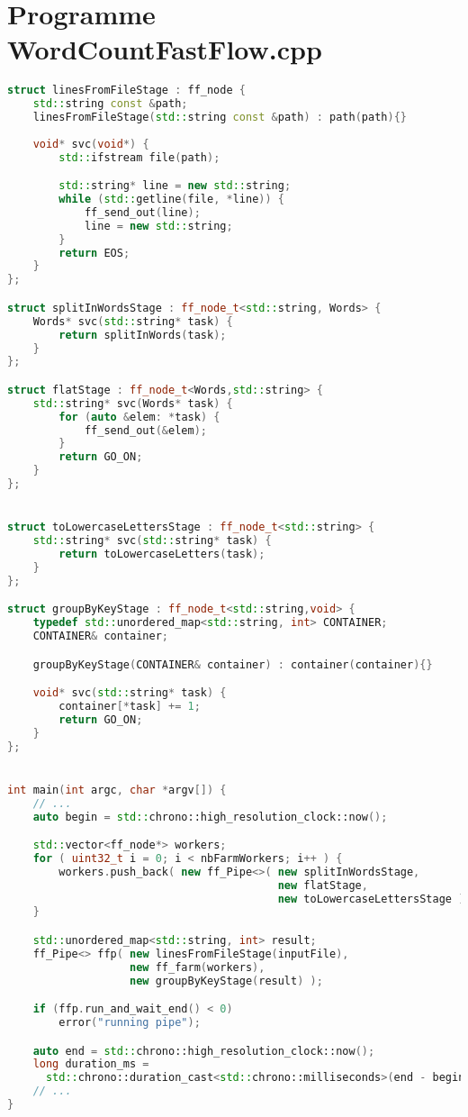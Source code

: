 \section{Programme {WordCountFastFlow.cpp}}
\begin{lstlisting}[basicstyle=\ttfamily\footnotesize,language=c++]
struct linesFromFileStage : ff_node {
    std::string const &path;
    linesFromFileStage(std::string const &path) : path(path){}
    
    void* svc(void*) {
        std::ifstream file(path);

        std::string* line = new std::string;
        while (std::getline(file, *line)) {
            ff_send_out(line);
            line = new std::string;
        }
        return EOS;
    }
};

struct splitInWordsStage : ff_node_t<std::string, Words> {
    Words* svc(std::string* task) {
        return splitInWords(task);
    }
};

struct flatStage : ff_node_t<Words,std::string> {
    std::string* svc(Words* task) {
        for (auto &elem: *task) {
            ff_send_out(&elem);
        }
        return GO_ON;
    }
};


struct toLowercaseLettersStage : ff_node_t<std::string> {
    std::string* svc(std::string* task) {
        return toLowercaseLetters(task);
    }
};

struct groupByKeyStage : ff_node_t<std::string,void> {
    typedef std::unordered_map<std::string, int> CONTAINER;
    CONTAINER& container;

    groupByKeyStage(CONTAINER& container) : container(container){}

    void* svc(std::string* task) {
        container[*task] += 1;
        return GO_ON;
    }
};


int main(int argc, char *argv[]) {
    // ...
    auto begin = std::chrono::high_resolution_clock::now();

    std::vector<ff_node*> workers;
    for ( uint32_t i = 0; i < nbFarmWorkers; i++ ) {
        workers.push_back( new ff_Pipe<>( new splitInWordsStage,
                                          new flatStage,
                                          new toLowercaseLettersStage ) );
    }

    std::unordered_map<std::string, int> result;
    ff_Pipe<> ffp( new linesFromFileStage(inputFile),
                   new ff_farm(workers),
                   new groupByKeyStage(result) );

    if (ffp.run_and_wait_end() < 0) 
        error("running pipe");

    auto end = std::chrono::high_resolution_clock::now();
    long duration_ms = 
      std::chrono::duration_cast<std::chrono::milliseconds>(end - begin).count();
    // ...
}
\end{lstlisting}

